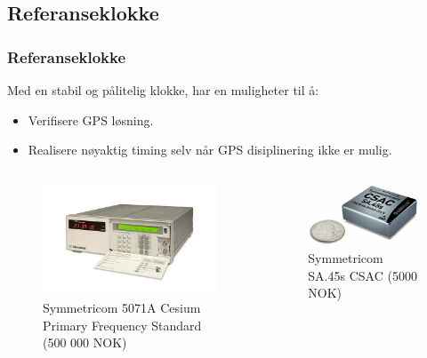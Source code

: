 \documentclass[xcolor=table]{beamer}
\begin{document}
\subsection{Referanseklokke}
\begin{frame}
  \frametitle{Referanseklokke}
  Med en stabil og pålitelig klokke, har en muligheter til å:
  \begin{itemize}
    \item Verifisere GPS løsning.
    \item Realisere nøyaktig timing selv når GPS disiplinering ikke er mulig.
  \end{itemize}
  \begin{columns}
      \begin{figure}
        \includegraphics[scale=0.2]{pics/5071A.jpg}
        \caption{Symmetricom 5071A Cesium Primary Frequency Standard (500 000 NOK)}
      \end{figure}
      \begin{figure}
        \includegraphics[scale=0.2]{thesis/graphics/csac.jpg}
      \caption{Symmetricom SA.45s CSAC (5000 NOK)}
    \end{figure}
  \end{columns}
\end{frame}
\end{document}
